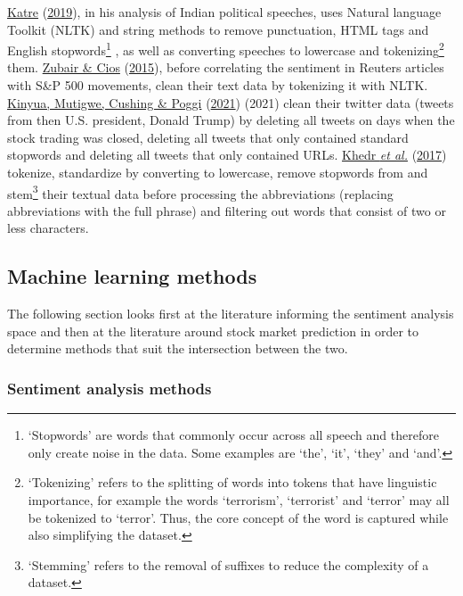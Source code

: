 \documentclass[11pt,preprint, authoryear]{elsarticle}
\numberwithin{equation}{section}
\numberwithin{figure}{section}
\numberwithin{table}{section}
\let\rmarkdownfootnote\footnote%
\def\footnote{\protect\rmarkdownfootnote}
\begin{document}
\protect\hyperlink{ref-katre2019nlp}{Katre}
(\protect\hyperlink{ref-katre2019nlp}{2019}), in his analysis of Indian
political speeches, uses Natural language Toolkit (NLTK) and string
methods to remove punctuation, HTML tags and English
stopwords\footnote{`Stopwords' are words that commonly occur across all
  speech and therefore only create noise in the data. Some examples are
  `the', `it', `they' and `and'.} , as well as converting speeches to
lowercase and tokenizing\footnote{`Tokenizing' refers to the splitting
  of words into tokens that have linguistic importance, for example the
  words `terrorism', `terrorist' and `terror' may all be tokenized to
  `terror'. Thus, the core concept of the word is captured while also
  simplifying the dataset.} them.
\protect\hyperlink{ref-zubair2015extracting}{Zubair \& Cios}
(\protect\hyperlink{ref-zubair2015extracting}{2015}), before correlating
the sentiment in Reuters articles with S\&P 500 movements, clean their
text data by tokenizing it with NLTK.
\protect\hyperlink{ref-kinyua2021analysis}{Kinyua, Mutigwe, Cushing \&
Poggi} (\protect\hyperlink{ref-kinyua2021analysis}{2021}) (2021) clean
their twitter data (tweets from then U.S. president, Donald Trump) by
deleting all tweets on days when the stock trading was closed, deleting
all tweets that only contained standard stopwords and deleting all
tweets that only contained URLs.
\protect\hyperlink{ref-khedr2017predicting}{Khedr \emph{et al.}}
(\protect\hyperlink{ref-khedr2017predicting}{2017}) tokenize,
standardize by converting to lowercase, remove stopwords from and
stem\footnote{`Stemming' refers to the removal of suffixes to reduce the
  complexity of a dataset.} their textual data before processing the
abbreviations (replacing abbreviations with the full phrase) and
filtering out words that consist of two or less characters.

\hypertarget{machine-learning-methods}{%
\subsection{Machine learning methods}\label{machine-learning-methods}}

The following section looks first at the literature informing the
sentiment analysis space and then at the literature around stock market
prediction in order to determine methods that suit the intersection
between the two.

\hypertarget{sentiment-analysis-methods}{%
\subsubsection{Sentiment analysis
methods}\label{sentiment-analysis-methods}}
\end{document}
